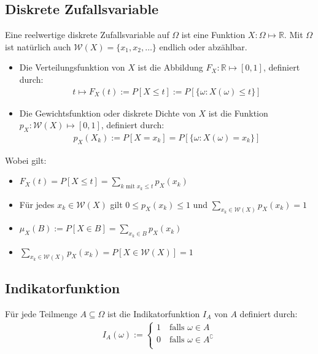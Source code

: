 \documentclass[8pt]{extarticle}
\newcommand{\R}{\mathbb{R}}
\newcommand{\W}{\mathcal{W}}
\begin{document}
\begin{multicols*}{3}
  \subsection*{Diskrete Zufallsvariable}
  Eine reelwertige diskrete Zufallsvariable auf $\Omega$ ist eine Funktion $X :
    \Omega \mapsto \R$. Mit $\Omega$ ist natürlich auch $\W (X) = \{x_1, x_2,
    \dots\}$ endlich oder abzählbar.
  \begin{itemize}
    \item Die Verteilungsfunktion von $X$ ist die Abbildung $F_X : \R \mapsto [0, 1]$,
          definiert durch:
          \begin{align*}
            t \mapsto F_X (t) := P[X \leq t] := P[\{\omega : X (\omega) \leq t\}]
          \end{align*}
    \item Die Gewichtsfunktion oder diskrete Dichte von $X$ ist die Funktion $p_X : \W (X)
            \mapsto [0, 1]$, definiert durch:
          \begin{align*}
            p_X (X_k) := P[X = x_k] = P[\{\omega : X (\omega) = x_k\}]
          \end{align*}
  \end{itemize}
  Wobei gilt:
  \begin{itemize}
    \item $F_X (t) = P[X \leq t] = \sum_{k \text{ mit } x_k \leq t} p_X (x_k)$
    \item Für jedes $x_k \in \W (X)$ gilt $0 \leq p_X (x_k) \leq 1$ und $\sum_{x_k \in
              \W (X)} p_X (x_k) = 1$
    \item $\mu_X (B) := P[X \in B] = \sum_{x_k \in B} p_X (x_k)$
    \item $\sum_{x_k \in \W (X)} p_X (x_k) = P[X \in \W (X)] = 1$
  \end{itemize}
  \subsection*{Indikatorfunktion}
  Für jede Teilmenge $A \subseteq \Omega$ ist die Indikatorfunktion $I_A$ von $A$
  definiert durch:
  \begin{align*}
    I_A (\omega) :=
    \begin{cases}
      1 \quad \text{falls } \omega \in A             \\
      0 \quad \text{falls } \omega \in A^\complement \\
    \end{cases}
  \end{align*}

\end{multicols*}
\end{document}
